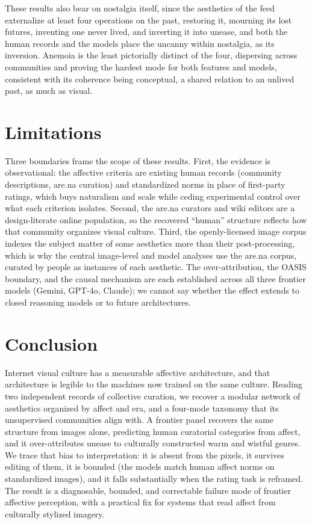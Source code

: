 \documentclass[11pt]{article}
\begin{document}
These results also bear on nostalgia itself, since the aesthetics of the feed externalize at least
four operations on the past, restoring it, mourning its lost futures, inventing one never lived, and
inverting it into unease, and both the human records and the models place the uncanny within
nostalgia, as its inversion. Anemoia is the least pictorially distinct of the four, dispersing
across communities and proving the hardest mode for both features and models, consistent with its
coherence being conceptual, a shared relation to an unlived past, as much as visual.

\section{Limitations}

Three boundaries frame the scope of these results. First, the evidence is observational: the
affective criteria are existing human records (community descriptions, are.na curation) and
standardized norms in place of first-party ratings, which buys naturalism and scale while ceding
experimental control over what each criterion isolates. Second, the are.na curators and
wiki editors are a design-literate online population, so the recovered ``human'' structure
reflects how that community organizes visual culture. Third, the openly-licensed image corpus
indexes the subject matter of some aesthetics more than their post-processing, which is why the
central image-level and model analyses use the are.na corpus, curated by people as instances of
each aesthetic. The over-attribution, the OASIS boundary, and the causal mechanism are each
established across all three frontier models (Gemini, GPT-4o, Claude); we cannot say whether the
effect extends to closed reasoning models or to future architectures.

\section{Conclusion}

Internet visual culture has a measurable affective architecture, and that architecture is
legible to the machines now trained on the same culture. Reading two independent records of
collective curation, we recover a modular network of aesthetics organized by affect and era, and
a four-mode taxonomy that its unsupervised communities align with. A frontier panel recovers the
same structure from images alone, predicting human curatorial categories from affect, and it
over-attributes unease to culturally constructed warm and wistful genres. We trace that bias to
interpretation: it is absent from the pixels, it survives editing of them, it is bounded (the
models match human affect norms on standardized images), and it falls substantially when the
rating task is reframed. The result is a diagnosable, bounded, and correctable failure mode of
frontier affective perception, with a practical fix for systems that read affect from culturally
stylized imagery.
\end{document}
